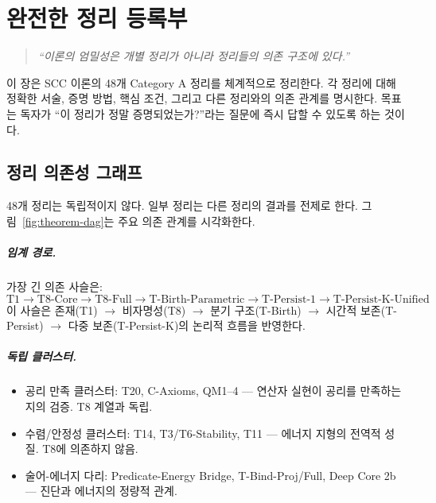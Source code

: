 
\chapter{완전한 정리 등록부}
\label{ch:theorem-registry}

\begin{quote}
\textit{``이론의 엄밀성은 개별 정리가 아니라 정리들의 의존 구조에 있다.''}
\end{quote}

\noindent
이 장은 SCC 이론의 48개 Category A 정리를 체계적으로 정리한다. 각 정리에 대해 정확한 서술, 증명 방법, 핵심 조건, 그리고 다른 정리와의 의존 관계를 명시한다. 목표는 독자가 ``이 정리가 정말 증명되었는가?''라는 질문에 즉시 답할 수 있도록 하는 것이다.


\section{정리 의존성 그래프}
\label{sec:theorem-dag}

48개 정리는 독립적이지 않다. 일부 정리는 다른 정리의 결과를 전제로 한다. 그림~\ref{fig:theorem-dag}는 주요 의존 관계를 시각화한다.

\paragraph{임계 경로.}
가장 긴 의존 사슬은:
\[
\text{T1} \to \text{T8-Core} \to \text{T8-Full} \to \text{T-Birth-Parametric} \to \text{T-Persist-1} \to \text{T-Persist-K-Unified}
\]
이 사슬은 존재(T1) $\to$ 비자명성(T8) $\to$ 분기 구조(T-Birth) $\to$ 시간적 보존(T-Persist) $\to$ 다중 보존(T-Persist-K)의 논리적 흐름을 반영한다.

\paragraph{독립 클러스터.}
\begin{itemize}
    \item 공리 만족 클러스터: T20, C-Axioms, QM1--4 --- 연산자 실현이 공리를 만족하는지의 검증. T8 계열과 독립.
    \item 수렴/안정성 클러스터: T14, T3/T6-Stability, T11 --- 에너지 지형의 전역적 성질. T8에 의존하지 않음.
    \item 술어-에너지 다리: Predicate-Energy Bridge, T-Bind-Proj/Full, Deep Core 2b --- 진단과 에너지의 정량적 관계.
\end{itemize}

